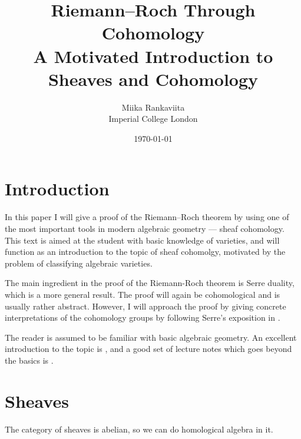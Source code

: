 \documentclass[12pt]{article}
\begin{document}
\title{Riemann--Roch Through Cohomology\\
        \large A Motivated Introduction to Sheaves and Cohomology}
\author{Miika Rankaviita\\Imperial College London}
\date{\today}
\maketitle

\section{Introduction}
In this paper I will give a proof of the Riemann--Roch theorem
by using one of the most important tools in modern algebraic geometry ---
sheaf cohomology. This text is aimed at the student with
basic knowledge of varieties, and will function as an introduction
to the topic of sheaf cohomolgy, motivated by the problem of classifying
algebraic varieties.


The main ingredient in the proof of the Riemann-Roch theorem is
Serre duality, which is a more general result. The proof will again
be cohomological and is usually rather abstract. However, I will
approach the proof by giving concrete interpretations of
the cohomology groups by following Serre's exposition in \cite{serre}.

The reader is assumed to be familiar with basic algebraic geometry.
An excellent introduction to the topic is \cite{reid}, and a good set
of lecture notes which goes beyond the basics is \cite{gathmann}.

\section{Sheaves}
The category of sheaves is abelian, so we can do homological
algebra in it.
\end{document}
